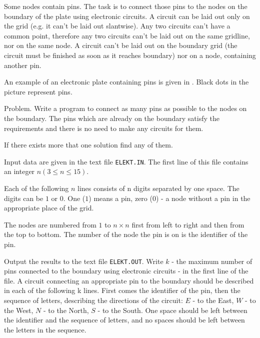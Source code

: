 Some nodes contain pins. The task is to connect those pins to the nodes on the boundary
of the plate using electronic circuits. A circuit can be laid out only on the grid (e.g.
it can't be laid out slantwise). Any two circuits can't have a common point, therefore
any two circuits can't be laid out on the same gridline, nor on the same node. A circuit
can't be laid out on the boundary grid (the circuit must be finished as soon as it reaches
boundary) nor on a node, containing another pin.

An example of an electronic plate containing pins is given in . Black dots in the
picture represent pins.

Problem. Write a program to connect as many pins as possible to the nodes on the boundary.
The pins which are already on the boundary satisfy the requirements and there is no need
to make any circuits for them.

If there exists more that one solution find any of them.

Input data are given in the text file \verb|ELEKT.IN|. The first line of this file contains an
integer $n (3 \leq n \leq 15)$.

Each of the following $n$ lines consists of n digits separated by one space. The digits
can be $1$ or $0$. One ($1$) means a pin, zero ($0$) - a node without a pin in the
appropriate place of the grid.

The nodes are numbered from $1$ to $n\times n$ first from left to right and then from
the top to bottom. The number of the node the pin is on is the identifier of the pin.

Output the results to the text file \verb|ELEKT.OUT|. Write $k$ - the maximum number of
pins connected to the boundary using electronic circuits - in the first line of the file.
A circuit connecting an appropriate pin to the boundary should be described in each of
the following k lines. First comes the identifier of the pin, then the sequence of
letters, describing the directions of the circuit: $E$ - to the East, $W$ - to the West,
$N$ - to the North, $S$ - to the South. One space should be left between the identifier
and the sequence of letters, and no spaces should be left between the letters in the sequence.

